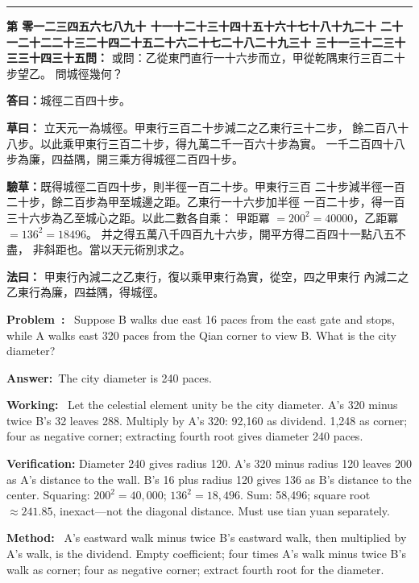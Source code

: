 \documentclass[9pt,a4paper]{article}
\newcounter{probnum}
\newcounter{overallnum}
\newcommand{\chnum}[1]{%
  \ifcase#1 零\or 一\or 二\or 三\or 四\or 五\or 六\or 七\or 八\or 九\or 十\or
    十一\or 十二\or 十三\or 十四\or 十五\or 十六\or 十七\or 十八\or 十九\or 二十\or
    二十一\or 二十二\or 二十三\or 二十四\or 二十五\or 二十六\or 二十七\or 二十八\or 二十九\or 三十\or
    三十一\or 三十二\or 三十三\or 三十四\or 三十五\fi}
\newcommand{\problem}[1]{\stepcounter{probnum}\stepcounter{overallnum}\par\noindent\textbf{\color{volcolor}第\chnum{\value{probnum}}問：}#1\par\vspace{0.15cm}}
\newcommand{\answer}[1]{\par\noindent\textbf{答曰：}#1\par\vspace{0.15cm}}
\newcommand{\working}[1]{\par\noindent\textbf{草曰：}#1\par\vspace{0.15cm}}
\newcommand{\method}[1]{\par\noindent\textbf{法曰：}#1\par\vspace{0.25cm}}
\newcommand{\eproblem}[1]{\par\noindent\textbf{\color{volcolor}Problem~\theoverallnum:}~#1\par\vspace{0.15cm}}
\newcommand{\eanswer}[1]{\par\noindent\textbf{Answer:}~#1\par\vspace{0.15cm}}
\newcommand{\eworking}[1]{\par\noindent\textbf{Working:}~#1\par\vspace{0.15cm}}
\newcommand{\emethod}[1]{\par\noindent\textbf{Method:}~#1\par\vspace{0.25cm}}
\begin{document}
\vspace{0.15cm}
\noindent\rule{\textwidth}{0.2pt}
\vspace{0.15cm}

\noindent\begin{minipage}[t]{0.48\textwidth}
\problem{
或問：乙從東門直行一十六步而立，甲從乾隅東行三百二十步望乙。
問城徑幾何？
}

\answer{城徑二百四十步。}

\working{
立天元一為城徑。甲東行三百二十步減二之乙東行三十二步，
餘二百八十八步。以此乘甲東行三百二十步，得九萬二千一百六十步為實。
一千二百四十八步為廉，四益隅，開三乘方得城徑二百四十步。

\textbf{驗草：}既得城徑二百四十步，則半徑一百二十步。甲東行三百
二十步減半徑一百二十步，餘二百步為甲至城邊之距。乙東行一十六步加半徑
一百二十步，得一百三十六步為乙至城心之距。以此二數各自乘：
甲距冪 $= 200^2 = 40000$，乙距冪 $= 136^2 = 18496$。
并之得五萬八千四百九十六步，開平方得二百四十一點八五不盡，
非斜距也。當以天元術別求之。
}

\method{
甲東行內減二之乙東行，復以乘甲東行為實，從空，四之甲東行
內減二之乙東行為廉，四益隅，得城徑。
}
\end{minipage}%
\hfill%
\begin{minipage}[t]{0.50\textwidth}
\eproblem{
Suppose B walks due east 16 paces from the east gate and stops, while A walks
east 320 paces from the Qian corner to view B. What is the city diameter?
}

\eanswer{The city diameter is 240 paces.}

\eworking{
Let the celestial element unity be the city diameter. A's 320 minus twice
B's 32 leaves 288. Multiply by A's 320: 92,160 as dividend. 1,248 as corner;
four as negative corner; extracting fourth root gives diameter 240 paces.

\textbf{Verification:} Diameter 240 gives radius 120. A's 320 minus radius 120
leaves 200 as A's distance to the wall. B's 16 plus radius 120 gives 136 as
B's distance to the center. Squaring: $200^2 = 40{,}000$; $136^2 = 18{,}496$.
Sum: 58,496; square root $\approx 241.85$, inexact---not the diagonal distance.
Must use tian yuan separately.
}

\emethod{
A's eastward walk minus twice B's eastward walk, then multiplied by A's walk,
is the dividend. Empty coefficient; four times A's walk minus twice B's walk
as corner; four as negative corner; extract fourth root for the diameter.
}
\end{minipage}
\vspace{0.15cm}
\end{document}
